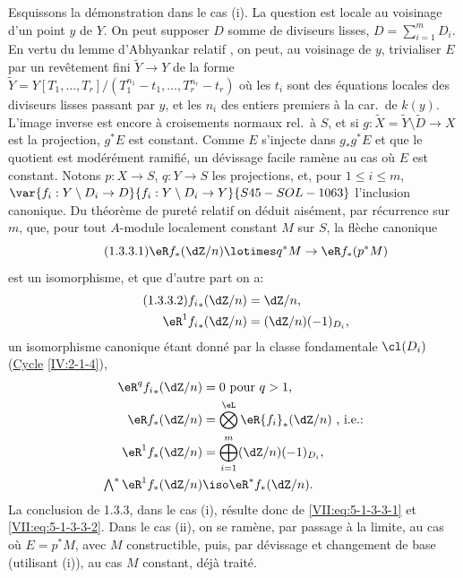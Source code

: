 Esquissons la démonstration dans le cas (i). La question est locale au 
voisinage d'un point $y$ de $Y$. On peut supposer $D$ somme de diviseurs 
lisses, $D=\sum_{i=1}^m D_i$. En vertu du lemme d'Abhyankar relatif 
\cite[XIII 5.5]{sga1}, on peut, au voisinage de $y$, trivialiser $E$ par un 
revêtement fini $\widetilde Y\to Y$ de la forme 
$\widetilde Y=Y[T_1,\dots,T_r]/(T_1^{n_1}-t_1,\dots,T_r^{n_r}-t_r)$ où les 
$t_i$ sont des équations locales des diviseurs lisses passant par $y$, et les 
$n_i$ des entiers premiers à la car.\ de $k(y)$. L'image inverse 
 est encore à croisements normaux rel.\ à 
$S$, et si $g:\widetilde X=\widetilde Y\setminus \widetilde D\to X$ est la 
projection, $g^\ast E$ est constant. Comme $E$ s'injecte dans $g_\ast g^\ast E$ 
et que le quotient est modérément ramifié, un dévissage facile ramène 
au cas où $E$ est constant. Notons $p:X\to S$, $q:Y\to S$ les 
projections, et, pour $1\leqslant i\leqslant m$, $\var{f_i:Y\setminus D_i \to D}{f_i:Y\setminus D_i \to Y}{S45-SOL-1063}$ 
l'inclusion canonique. Du théorème de pureté relatif \cite[XVI 3.7]{sga4} 
on déduit aisément, par récurrence sur $m$, que, pour tout $A$-module 
localement constant $M$ sur $S$, la flèche canonique 
\begin{equation*}\tag{1.3.3.1}\label{VII:eq:5-1-3-3-1} %
  \eR f_\ast (\dZ/n)\lotimes q^\ast M\to \eR f_\ast (p^\ast M) 
\end{equation*}
est un isomorphisme, et que d'autre part on a: 
\begin{align*}\tag{1.3.3.2}\label{VII:eq:5-1-3-3-2}
  {f_i}_\ast(\dZ/n) &= \dZ/n \text{,} \\
  \eR^1 {f_i}_\ast (\dZ/n) &= (\dZ/n)(-1)_{D_i} \text{,} 
\end{align*}
un isomorphisme canonique étant donné par la classe fondamentale $\cl(D_i)$ 
(\hyperref[IV]{Cycle} \ref{IV:2-1-4}), 
\begin{align*}
  \eR^q {f_i}_\ast(\dZ/n) &= 0\text{ pour $q>1$,} \\
  \eR f_\ast (\dZ/n) &= \bigotimes^\eL \eR {f_i}_\ast (\dZ/n) \text{ , i.e.:} \\
  \eR^1 f_\ast(\dZ/n) &= \bigoplus_{i=1}^m (\dZ/n)(-1)_{D_i} \text{,} \\
  \textstyle\bigwedge^\ast \eR^1 f_\ast(\dZ/n) &\iso \eR^\ast f_\ast (\dZ/n) \text{.} 
\end{align*}
La conclusion de 1.3.3, dans le cas (i), résulte donc de 
\eqref{VII:eq:5-1-3-3-1} et \eqref{VII:eq:5-1-3-3-2}. Dans le cas (ii), on se 
ramène, par passage à la limite, au cas où $E=p^\ast M$, avec $M$ 
constructible, puis, par dévissage et changement de base (utilisant (i)), au 
cas $M$ constant, déjà traité. 

